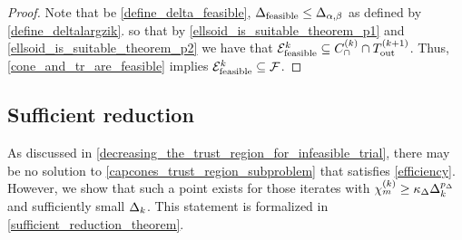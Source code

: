\begin{proof}

Note that be \cref{define_delta_feasible}, ${\Delta_{\textrm{feasible}}} \le {\Delta_{\alpha,\beta}}$ as defined by \cref{define_deltalargzik}. so that
by \cref{ellsoid_is_suitable_theorem_p1} and \cref{ellsoid_is_suitable_theorem_p2} we have that 
${\mathcal E^k_{\textrm{feasible}}} \subseteq {C^{(k)}_{\cap}} \cap {T_{\text{out}}^{(k+1)}}$.
Thus, \cref{cone_and_tr_are_feasible} implies ${\mathcal E^k_{\textrm{feasible}}} \subseteq {\mathcal F}$.



\end{proof}







\subsection{Sufficient reduction}
\label{sufficient_reduction_section}

As discussed in \cref{decreasing_the_trust_region_for_infeasible_trial}, there may be no solution to \cref{capcones_trust_region_subproblem} 
that satisfies \cref{efficiency}.
However, we show that such a point exists for those iterates with ${\chi_m^{(k)}} \ge \kappa_{\Delta}\Delta_k^{p_{\Delta}}$ and sufficiently small $\Delta_k$.
This statement is formalized in \cref{sufficient_reduction_theorem}.

% 
% 

